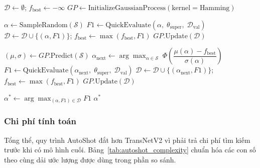 \begin{algorithm}[H]
\caption{Bayesian Architecture Search}
\label{alg:bayesian_search}
\begin{algorithmic}[1]
\State $\mathcal{D} \gets \emptyset$; \; $f_{\mathrm{best}} \gets -\infty$
\State $GP \gets \text{InitializeGaussianProcess}(\text{kernel} = \text{Hamming})$

\State {}
        \State $\alpha \gets \mathrm{SampleRandom}(\mathcal{S})$
        \State $F1 \gets \text{QuickEvaluate}(\alpha,\; \theta_{\mathrm{super}},\; \mathcal{D}_{\mathrm{val}})$
        \State $\mathcal{D} \gets \mathcal{D} \cup \{(\alpha, F1)\}$; \; $f_{\mathrm{best}} \gets \max(f_{\mathrm{best}}, F1)$
        \State $GP.\text{Update}(\mathcal{D})$
    \EndFor
\EndFor

\State {}
        \State $(\mu, \sigma) \gets GP.\text{Predict}(\mathcal{S})$
        \State $\alpha_{\mathrm{next}} \gets \arg\max_{\alpha \in \mathcal{S}} \;\Phi\!\left(\dfrac{\mu(\alpha) - f_{\mathrm{best}}}{\sigma(\alpha)}\right)$
        \State $F1 \gets \text{QuickEvaluate}(\alpha_{\mathrm{next}},\; \theta_{\mathrm{super}},\; \mathcal{D}_{\mathrm{val}})$
        \State $\mathcal{D} \gets \mathcal{D} \cup \{(\alpha_{\mathrm{next}}, F1)\}$; \; $f_{\mathrm{best}} \gets \max(f_{\mathrm{best}}, F1)$
        \State $GP.\text{Update}(\mathcal{D})$
    \EndFor
\EndFor

\State $\alpha^* \gets \arg\max_{(\alpha, F1) \in \mathcal{D}} F1$
\State \Return $\alpha^*$
\EndFunction
\end{algorithmic}
\end{algorithm}

\subsubsection{Chi phí tính toán}
\label{subsec:autoshot_complexity}

Tổng thể, quy trình AutoShot đắt hơn TransNetV2 vì phải trả chi phí tìm kiếm trước khi có mô hình cuối. Bảng~\ref{tab:autoshot_complexity} chuẩn hóa các con số theo cùng dải ước lượng được dùng trong phần so sánh.

